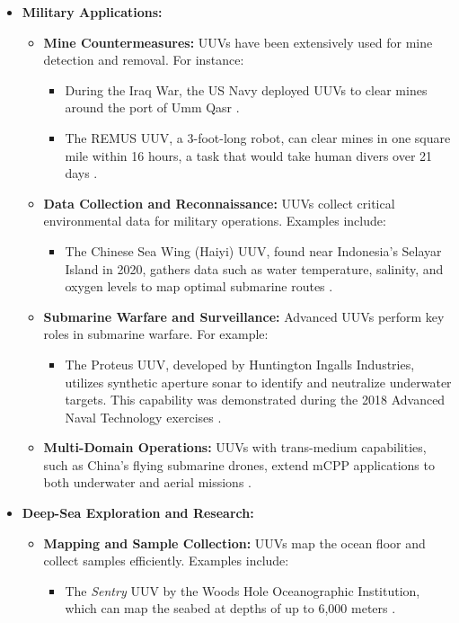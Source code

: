 \begin{itemize}
	\item \textbf{Military Applications:}
	\begin{itemize}
		\item \textbf{Mine Countermeasures:}  
		UUVs have been extensively used for mine detection and removal. For instance:
		\begin{itemize}
			\item During the Iraq War, the US Navy deployed UUVs to clear mines around the port of Umm Qasr \cite{RAND}.
			\item The REMUS UUV, a 3-foot-long robot, can clear mines in one square mile within 16 hours, a task that would take human divers over 21 days \cite{REMUS}.
		\end{itemize}
		
		\item \textbf{Data Collection and Reconnaissance:}  
		UUVs collect critical environmental data for military operations. Examples include:
		\begin{itemize}
			\item The Chinese Sea Wing (Haiyi) UUV, found near Indonesia’s Selayar Island in 2020, gathers data such as water temperature, salinity, and oxygen levels to map optimal submarine routes \cite{SeaWing}.
		\end{itemize}
		
		\item \textbf{Submarine Warfare and Surveillance:}  
		Advanced UUVs perform key roles in submarine warfare. For example:
		\begin{itemize}
			\item The Proteus UUV, developed by Huntington Ingalls Industries, utilizes synthetic aperture sonar to identify and neutralize underwater targets. This capability was demonstrated during the 2018 Advanced Naval Technology exercises \cite{Proteus}.
		\end{itemize}
		
		\item \textbf{Multi-Domain Operations:}  
		UUVs with trans-medium capabilities, such as China’s flying submarine drones, extend mCPP applications to both underwater and aerial missions \cite{Harbin2022}.
	\end{itemize}
	
	\item \textbf{Deep-Sea Exploration and Research:}
	\begin{itemize}
		\item \textbf{Mapping and Sample Collection:}  
		UUVs map the ocean floor and collect samples efficiently. Examples include:
		\begin{itemize}
			\item The \textit{Sentry} UUV by the Woods Hole Oceanographic Institution, which can map the seabed at depths of up to 6,000 meters \cite{WHOI}.
		\end{itemize}
		

\end{itemize}
\end{itemize}
